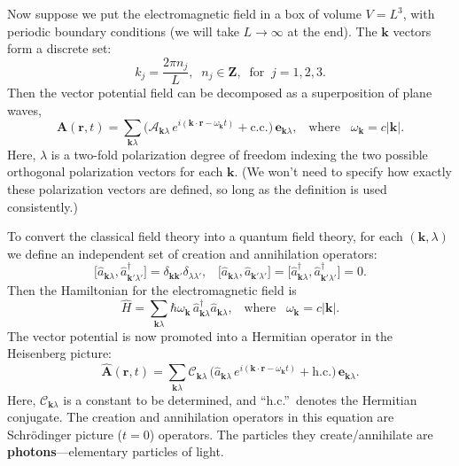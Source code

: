 \documentclass[prx,12pt]{revtex4-2}
\begin{document}
Now suppose we put the electromagnetic field in a box of volume $V =
L^3$, with periodic boundary conditions (we will take $L \rightarrow
\infty$ at the end).  The $\mathbf{k}$ vectors form a discrete set:
\begin{equation}
  k_j = \frac{2\pi n_j}{L}, \;\; n_j \in \mathbf{Z}, \;\;\mathrm{for}
  \;\; j = 1,2,3.
\end{equation}
Then the vector potential field can be decomposed as a superposition
of plane waves,
\begin{equation}
  \mathbf{A}(\mathbf{r},t) = \sum_{\mathbf{k}\lambda} 
  \Big(\mathcal{A}_{\mathbf{k}\lambda} \, e^{i(\mathbf{k}\cdot\mathbf{r} - \omega_{\mathbf{k}} t)}
  + \mathrm{c.c.}\Big)\, \mathbf{e}_{\mathbf{k}\lambda},
  \;\;\; \mathrm{where}
  \;\;\;\omega_{\mathbf{k}} = c|\mathbf{k}|.
\end{equation}
Here, $\lambda$ is a two-fold polarization degree of freedom indexing
the two possible orthogonal polarization vectors for each
$\mathbf{k}$.  (We won't need to specify how exactly these
polarization vectors are defined, so long as the definition is used
consistently.)

To convert the classical field theory into a quantum field theory, for
each $(\mathbf{k},\lambda)$ we define an independent set of creation
and annihilation operators:
\begin{equation}
  \big[\hat{a}_{\mathbf{k}\lambda}, \hat{a}_{\mathbf{k}'\lambda'}^\dagger\big]
  = \delta_{\mathbf{k}\mathbf{k}'} \delta_{\lambda\lambda'}, \;\;\;
  \big[\hat{a}_{\mathbf{k}\lambda}, \hat{a}_{\mathbf{k}'\lambda'}\big]
  = \big[\hat{a}_{\mathbf{k}\lambda}^\dagger, \hat{a}_{\mathbf{k}'\lambda'}^\dagger\big]
  = 0.
\end{equation}
Then the Hamiltonian for the electromagnetic field is
\begin{equation}
  \hat{H} = \sum_{\mathbf{k}\lambda} \hbar \omega_{\mathbf{k}} \,
  \hat{a}^\dagger_{\mathbf{k}\lambda} \hat{a}_{\mathbf{k}\lambda},
  \;\;\; \mathrm{where}
  \;\;\;\omega_{\mathbf{k}} = c|\mathbf{k}|.
\end{equation}
The vector potential is now promoted into a Hermitian operator in the
Heisenberg picture:
\begin{equation}
  \hat{\mathbf{A}}(\mathbf{r},t) = \sum_{\mathbf{k}\lambda} 
  \mathcal{C}_{\mathbf{k}\lambda}\,
  \Big(\hat{a}_{\mathbf{k}\lambda} \, e^{i(\mathbf{k}\cdot\mathbf{r} - \omega_{\mathbf{k}} t)}
  + \mathrm{h.c.}\Big)\, \mathbf{e}_{\mathbf{k}\lambda}.
  \label{Aquantum}
\end{equation}
Here, $\mathcal{C}_{\mathbf{k}\lambda}$ is a constant to be
determined, and ``h.c.''~denotes the Hermitian conjugate.  The
creation and annihilation operators in this equation are Schr\"odinger
picture ($t = 0$) operators.  The particles they create/annihilate are
\textbf{photons}---elementary particles of light.
\end{document}
